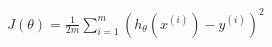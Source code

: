 \documentclass[preview]{standalone}
\begin{document}
\begin{align*}
J(\theta) = \frac{1}{2m} \sum_{i=1}^m (h_\theta(x^{(i)}) - y^{(i)})^2
\end{align*}
\end{document}
